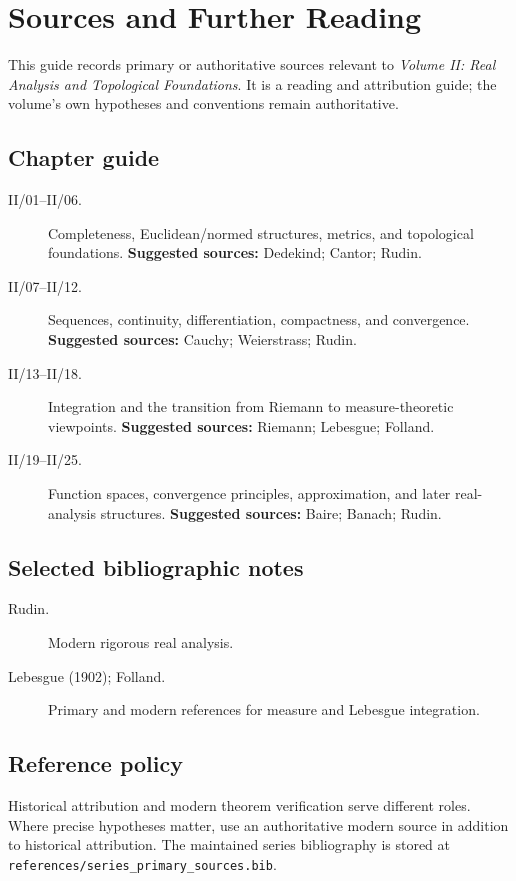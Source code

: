 \chapter*{Sources and Further Reading}
{}

This guide records primary or authoritative sources relevant to \emph{Volume II: Real Analysis and Topological Foundations}.
It is a reading and attribution guide; the volume's own hypotheses and conventions remain authoritative.

\section*{Chapter guide}
\begin{description}
\item[II/01--II/06.] Completeness, Euclidean/normed structures, metrics, and topological foundations.
\textbf{Suggested sources:} Dedekind; Cantor; Rudin.

\item[II/07--II/12.] Sequences, continuity, differentiation, compactness, and convergence.
\textbf{Suggested sources:} Cauchy; Weierstrass; Rudin.

\item[II/13--II/18.] Integration and the transition from Riemann to measure-theoretic viewpoints.
\textbf{Suggested sources:} Riemann; Lebesgue; Folland.

\item[II/19--II/25.] Function spaces, convergence principles, approximation, and later real-analysis structures.
\textbf{Suggested sources:} Baire; Banach; Rudin.

\end{description}

\section*{Selected bibliographic notes}
\begin{description}
\item[Rudin.] Modern rigorous real analysis.

\item[Lebesgue (1902); Folland.] Primary and modern references for measure and Lebesgue integration.

\end{description}

\section*{Reference policy}
Historical attribution and modern theorem verification serve different roles.
Where precise hypotheses matter, use an authoritative modern source in addition to historical attribution.
The maintained series bibliography is stored at \texttt{references/series\_primary\_sources.bib}.
